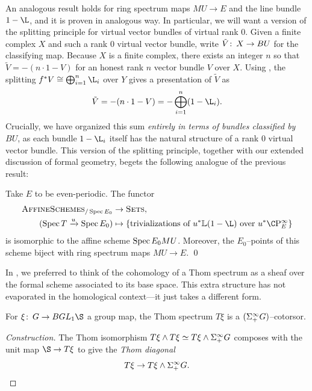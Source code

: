 An analogous result holds for ring spectrum maps \(MU \to E\) and the line bundle \(1 - \L\), and it is proven in analogous way.
In particular, we will want a version of the splitting principle for virtual vector bundles of virtual rank \(0\).
Given a finite complex \(X\) and such a rank \(0\) virtual vector bundle, write \(\tilde V \colon\thinspace X \to BU\) for the classifying map.
Because \(X\) is a finite complex, there exists an integer \(n\) so that \(\tilde V = -(n \cdot 1 - V)\) for an honest rank \(n\) vector bundle \(V\) over \(X\).
Using , the splitting \(f^* V \cong \bigoplus_{i=1}^n \L_i\) over \(Y\) gives a presentation of \(\tilde V\) as \[\tilde V = -(n \cdot 1 - V) = -\bigoplus_{i=1}^n (1 - \L_i).\]
Crucially, we have organized this sum \emph{entirely in terms of bundles classified by \(BU\)}, as each bundle \(1 - \L_i\) itself has the natural structure of a rank \(0\) virtual vector bundle.
This version of the splitting principle, together with our extended discussion of formal geometry, begets the following analogue of the previous result:
\begin{theorem}\label{BUTriumvirate}
Take \(E\) to be even-periodic.
The functor
\begin{align*}
\CatOf{AffineSchemes}_{/\Spec E_0} & \to \CatOf{Sets}, \\
(\Spec T \xrightarrow{u} \Spec E_0) & \mapsto \left\{ \text{trivializations of \(u^* \ThomSheaf{1 - \L}\) over \(u^* \CP^\infty_E\)} \right\}
\end{align*}
is isomorphic to the affine scheme \(\operatorname{Spec} E_0 MU\).
Moreover, the \(E_0\)--points of this scheme biject with ring spectrum maps \(MU \to E\). \qed
\end{theorem}

In , we preferred to think of the cohomology of a Thom spectrum as a sheaf over the formal scheme associated to its base space.
This extra structure has not evaporated in the homological context---it just takes a different form.
\begin{lemma}
For \(\xi\co G \to BGL_1 \S\) a group map, the Thom spectrum \(T\xi\) is a \((\Sigma^\infty_+ G)\)--cotorsor.
\end{lemma}
\begin{proof}[Construction]
The Thom isomorphism \(T\xi \wedge T\xi \simeq T\xi \wedge \Sigma^\infty_+ G\) composes with the unit map \(\S \to T\xi\) to give the \textit{Thom diagonal} \[T\xi \to T\xi \wedge \Sigma^\infty_+ G. \qedhere\]
\end{proof}

